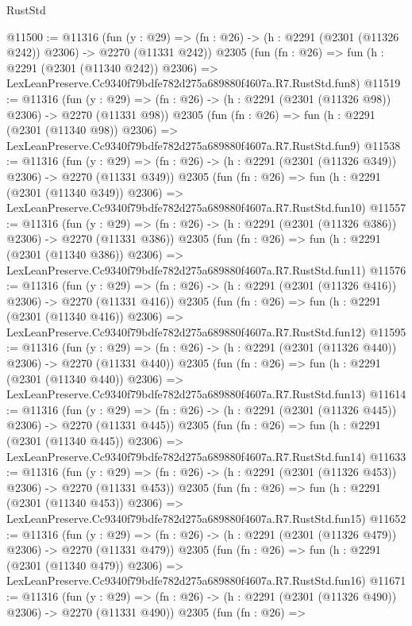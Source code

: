 \begin{lexlean}{RustStd}
\begin{coremodule}
@11500 := @11316
    (fun (y : @29) => (fn : @26) -> (h : @2291 (@2301 (@11326 @242)) @2306) -> @2270 (@11331 @242))
    @2305
    (fun (fn : @26) =>
    fun (h : @2291 (@2301 (@11340 @242)) @2306) =>
    LexLeanPreserve.Cc9340f79bdfe782d275a689880f4607a.R7.RustStd.fun8)
@11519 := @11316
    (fun (y : @29) => (fn : @26) -> (h : @2291 (@2301 (@11326 @98)) @2306) -> @2270 (@11331 @98))
    @2305
    (fun (fn : @26) =>
    fun (h : @2291 (@2301 (@11340 @98)) @2306) =>
    LexLeanPreserve.Cc9340f79bdfe782d275a689880f4607a.R7.RustStd.fun9)
@11538 := @11316
    (fun (y : @29) => (fn : @26) -> (h : @2291 (@2301 (@11326 @349)) @2306) -> @2270 (@11331 @349))
    @2305
    (fun (fn : @26) =>
    fun (h : @2291 (@2301 (@11340 @349)) @2306) =>
    LexLeanPreserve.Cc9340f79bdfe782d275a689880f4607a.R7.RustStd.fun10)
@11557 := @11316
    (fun (y : @29) => (fn : @26) -> (h : @2291 (@2301 (@11326 @386)) @2306) -> @2270 (@11331 @386))
    @2305
    (fun (fn : @26) =>
    fun (h : @2291 (@2301 (@11340 @386)) @2306) =>
    LexLeanPreserve.Cc9340f79bdfe782d275a689880f4607a.R7.RustStd.fun11)
@11576 := @11316
    (fun (y : @29) => (fn : @26) -> (h : @2291 (@2301 (@11326 @416)) @2306) -> @2270 (@11331 @416))
    @2305
    (fun (fn : @26) =>
    fun (h : @2291 (@2301 (@11340 @416)) @2306) =>
    LexLeanPreserve.Cc9340f79bdfe782d275a689880f4607a.R7.RustStd.fun12)
@11595 := @11316
    (fun (y : @29) => (fn : @26) -> (h : @2291 (@2301 (@11326 @440)) @2306) -> @2270 (@11331 @440))
    @2305
    (fun (fn : @26) =>
    fun (h : @2291 (@2301 (@11340 @440)) @2306) =>
    LexLeanPreserve.Cc9340f79bdfe782d275a689880f4607a.R7.RustStd.fun13)
@11614 := @11316
    (fun (y : @29) => (fn : @26) -> (h : @2291 (@2301 (@11326 @445)) @2306) -> @2270 (@11331 @445))
    @2305
    (fun (fn : @26) =>
    fun (h : @2291 (@2301 (@11340 @445)) @2306) =>
    LexLeanPreserve.Cc9340f79bdfe782d275a689880f4607a.R7.RustStd.fun14)
@11633 := @11316
    (fun (y : @29) => (fn : @26) -> (h : @2291 (@2301 (@11326 @453)) @2306) -> @2270 (@11331 @453))
    @2305
    (fun (fn : @26) =>
    fun (h : @2291 (@2301 (@11340 @453)) @2306) =>
    LexLeanPreserve.Cc9340f79bdfe782d275a689880f4607a.R7.RustStd.fun15)
@11652 := @11316
    (fun (y : @29) => (fn : @26) -> (h : @2291 (@2301 (@11326 @479)) @2306) -> @2270 (@11331 @479))
    @2305
    (fun (fn : @26) =>
    fun (h : @2291 (@2301 (@11340 @479)) @2306) =>
    LexLeanPreserve.Cc9340f79bdfe782d275a689880f4607a.R7.RustStd.fun16)
@11671 := @11316
    (fun (y : @29) => (fn : @26) -> (h : @2291 (@2301 (@11326 @490)) @2306) -> @2270 (@11331 @490))
    @2305
    (fun (fn : @26) =>

\end{coremodule}
\end{lexlean}
